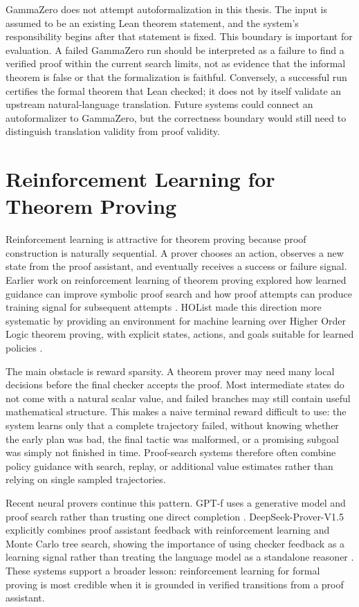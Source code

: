 \documentclass[en]{uet_awesome_thesis/uet-awesome-thesis}
\begin{document}
GammaZero does not attempt autoformalization in this thesis. The input is assumed to be an existing
Lean theorem statement, and the system's responsibility begins after that statement is fixed. This boundary
is important for evaluation. A failed GammaZero run should be interpreted as a failure to find a verified
proof within the current search limits, not as evidence that the informal theorem is false or that the
formalization is faithful. Conversely, a successful run certifies the formal theorem that Lean checked; it
does not by itself validate an upstream natural-language translation. Future systems could connect an
autoformalizer to GammaZero, but the correctness boundary would still need to distinguish translation
validity from proof validity.

\section{Reinforcement Learning for Theorem Proving}

Reinforcement learning is attractive for theorem proving because proof construction is naturally
sequential. A prover chooses an action, observes a new state from the proof assistant, and eventually
receives a success or failure signal. Earlier work on reinforcement learning of theorem proving explored
how learned guidance can improve symbolic proof search and how proof attempts can produce training
signal for subsequent attempts \citep{kaliszyk2018reinforcement}. HOList made this direction more
systematic by providing an environment for machine learning over Higher Order Logic theorem proving,
with explicit states, actions, and goals suitable for learned policies \citep{bansal2019holist}.

The main obstacle is reward sparsity. A theorem prover may need many local decisions before the final
checker accepts the proof. Most intermediate states do not come with a natural scalar value, and failed
branches may still contain useful mathematical structure. This makes a naive terminal reward difficult to
use: the system learns only that a complete trajectory failed, without knowing whether the early plan was
bad, the final tactic was malformed, or a promising subgoal was simply not finished in time. Proof-search
systems therefore often combine policy guidance with search, replay, or additional value estimates rather
than relying on single sampled trajectories.

Recent neural provers continue this pattern. GPT-f uses a generative model and proof search rather than
trusting one direct completion \citep{polu2020gptf}. DeepSeek-Prover-V1.5 explicitly combines proof
assistant feedback with reinforcement learning and Monte Carlo tree search, showing the importance of
using checker feedback as a learning signal rather than treating the language model as a standalone
reasoner \citep{xin2024deepseekproverv15}. These systems support a broader lesson: reinforcement
learning for formal proving is most credible when it is grounded in verified transitions from a proof
assistant.
\end{document}
